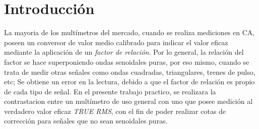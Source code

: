   \section{Introducción}
    La mayoria de los multímetros del mercado, cuando se realiza mediciones
    en CA, poseen un conversor de valor medio calibrado para indicar el 
    valor eficaz mediante la aplicación de un \textit{factor de relación}. 
    Por lo general, la relación del factor se hace superponiendo ondas 
    senoidales puras, por eso mismo, cuando se trata de medir otras señales 
    como ondas cuadradas, triangulares, trenes de pulso, etc;
    Se obtiene un error en la lectura, debido a que el factor de relación 
    es propio de cada tipo de señal. En el presente trabajo practico, 
    se realizara la contrastacion entre un multímetro de uso general con uno
    que posee medición al verdadero valor eficaz \textit{TRUE RMS}, con el 
    fin de poder realizar cotas de corrección para señales que no sean 
    senoidales puras. 
       